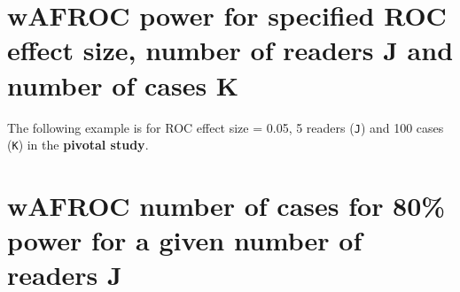 \documentclass[
]{book}
\newenvironment{Shaded}{\begin{snugshade}}{\end{snugshade}}
\newcommand{\CharTok}[1]{\textcolor[rgb]{0.31,0.60,0.02}{#1}}
\newcommand{\CommentTok}[1]{\textcolor[rgb]{0.56,0.35,0.01}{\textit{#1}}}
\newcommand{\DataTypeTok}[1]{\textcolor[rgb]{0.13,0.29,0.53}{#1}}
\newcommand{\DecValTok}[1]{\textcolor[rgb]{0.00,0.00,0.81}{#1}}
\newcommand{\FloatTok}[1]{\textcolor[rgb]{0.00,0.00,0.81}{#1}}
\newcommand{\KeywordTok}[1]{\textcolor[rgb]{0.13,0.29,0.53}{\textbf{#1}}}
\newcommand{\NormalTok}[1]{#1}
\newcommand{\OperatorTok}[1]{\textcolor[rgb]{0.81,0.36,0.00}{\textbf{#1}}}
\newcommand{\StringTok}[1]{\textcolor[rgb]{0.31,0.60,0.02}{#1}}
\begin{document}
\hypertarget{wafroc-power-for-specified-roc-effect-size-number-of-readers-j-and-number-of-cases-k}{%
\section{wAFROC power for specified ROC effect size, number of readers J and number of cases K}\label{wafroc-power-for-specified-roc-effect-size-number-of-readers-j-and-number-of-cases-k}}

The following example is for ROC effect size = 0.05, 5 readers (\texttt{J}) and 100 cases (\texttt{K}) in the \textbf{pivotal study}.

\begin{Shaded}
\end{Shaded}

\hypertarget{wafroc-number-of-cases-for-80-power-for-a-given-number-of-readers-j}{%
\section{wAFROC number of cases for 80\% power for a given number of readers J}\label{wafroc-number-of-cases-for-80-power-for-a-given-number-of-readers-j}}
\end{document}
